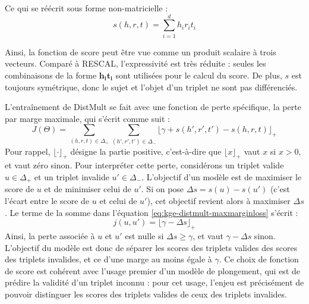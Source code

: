 Ce qui se réécrit sous forme non-matricielle :
\begin{equation}
    s(h, r, t) = \sum_{i=1}^{d} h_i r_i t_i
    \label{eq:kge-distmult-scorenv}
\end{equation}

Ainsi, la fonction de score peut être vue comme un produit scalaire à trois vecteurs. Comparé à RESCAL, l'expressivité est très réduite : seules les combinaisons de la forme $\mathbf{h_i t_i}$ sont utilisées pour le calcul du score. De plus, $s$ est toujours symétrique, donc le sujet et l'objet d'un triplet ne sont pas différenciés.



L'entraînement de DistMult se fait avec une fonction de perte spécifique, la perte par marge maximale, qui s'écrit comme suit :
\begin{equation}
    J(\Theta) = \sum_{(h, r, t) \in \Delta_+} \sum_{(h', r', t') \in \Delta_-} \lfloor \gamma + s(h', r', t') - s(h, r, t) \rfloor_+
    \label{eq:kge-distmult-maxmarginloss}
\end{equation}
Pour rappel, $\lfloor \cdot \rfloor_+$ désigne la partie positive, c'est-à-dire que $\lfloor x \rfloor_+$ vaut $x$ si $x > 0$, et vaut zéro sinon. Pour interpréter cette perte, considérons un triplet valide $u \in \Delta_+$ et un triplet invalide $u' \in \Delta_-$. L'objectif d'un modèle est de maximiser le score de $u$ et de minimiser celui de $u'$. Si on pose $\Delta s = s(u) - s(u')$ (c'est l'écart entre le score de $u$ et celui de $u'$), cet objectif revient alors à maximiser $\Delta s$. Le terme de la somme dans l'équation \ref{eq:kge-distmult-maxmarginloss} s'écrit :
\begin{equation}
    j(u, u') = \lfloor \gamma - \Delta s \rfloor_+
\end{equation}
Ainsi, la perte associée à $u$ et $u'$ est nulle si $\Delta s \geq \gamma$, et vaut $\gamma - \Delta s$ sinon. L'objectif du modèle est donc de séparer les scores des triplets valides des scores des triplets invalides, et ce d'une marge au moins égale à $\gamma$. Ce choix de fonction de score est cohérent avec l'usage premier d'un modèle de plongement, qui est de prédire la validité d'un triplet inconnu : pour cet usage, l'enjeu est précisément de pouvoir distinguer les scores des triplets valides de ceux des triplets invalides.

